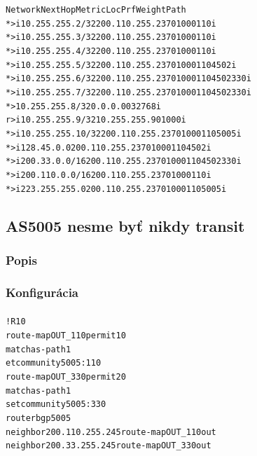\documentclass[12pt,twoside,a4paper]{report}
\begin{document}
{\begin{small}
\begin{alltt}
   Network          Next Hop            Metric LocPrf Weight Path
*>i10.255.255.2/32  200.110.255.237          0    100      0 110 i
*>i10.255.255.3/32  200.110.255.237          0    100      0 110 i
*>i10.255.255.4/32  200.110.255.237          0    100      0 110 i
*>i10.255.255.5/32  200.110.255.237          0    100      0 110 4502 i
*>i10.255.255.6/32  200.110.255.237          0    100      0 110 4502 330 i
*>i10.255.255.7/32  200.110.255.237          0    100      0 110 4502 330 i
*> 10.255.255.8/32  0.0.0.0                  0         32768 i
r>i10.255.255.9/32  10.255.255.9             0    100      0 i
*>i10.255.255.10/32 200.110.255.237          0    100      0 110 5005 i
*>i128.45.0.0       200.110.255.237          0    100      0 110 4502 i
*>i200.33.0.0/16    200.110.255.237          0    100      0 110 4502 330 i
*>i200.110.0.0/16   200.110.255.237          0    100      0 110 i
*>i223.255.255.0    200.110.255.237          0    100      0 110 5005 i
\end{alltt}
\end{small}
}




\subsection{AS5005 nesme byť nikdy transit}
\subsubsection{Popis}
\paragraph{}

\subsubsection{Konfigurácia}
\paragraph{}

\noindent
{\selectfont
\begin{small}
\begin{alltt}
!R10
route-map OUT_110 permit 10
  match as-path 1
  et community 5005:110
route-map OUT_330 permit 20
  match as-path 1
  set community 5005:330
router bgp 5005
  neighbor 200.110.255.245 route-map OUT_110 out
  neighbor 200.33.255.245 route-map OUT_330 out

\end{alltt}
\end{small}
}
\end{document}
